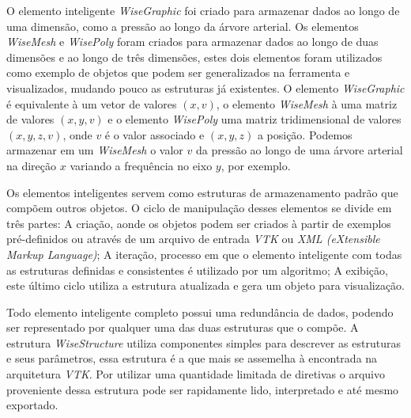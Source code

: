 \documentclass[a4paper,12pt]{monografia}
\theoremstyle{plain}
\theoremstyle{definition}
\theoremstyle{remark}
\begin{document}
O elemento inteligente \textit{WiseGraphic} foi criado para armazenar dados ao longo de uma dimensão, como a pressão ao longo da árvore arterial. Os elementos \textit{WiseMesh} e \textit{WisePoly} foram criados para armazenar dados ao longo de duas dimensões e ao longo de três dimensões, estes dois elementos foram utilizados como exemplo de objetos que podem ser generalizados na ferramenta e visualizados, mudando pouco as estruturas já existentes. O elemento \textit{WiseGraphic} é equivalente à um vetor de valores $(x,v)$, o elemento \textit{WiseMesh} à uma matriz de valores $(x,y,v)$ e o elemento \textit{WisePoly} uma matriz tridimensional de valores $(x,y,z,v)$, onde $v$ é o valor associado e $(x,y,z)$ a posição. Podemos armazenar em um \textit{WiseMesh} o valor $v$ da pressão ao longo de uma árvore arterial na direção $x$ variando a frequência no eixo $y$, por exemplo.

Os elementos inteligentes servem como estruturas de armazenamento padrão que compõem outros objetos. O ciclo de manipulação desses elementos se divide em três partes: A criação, aonde os objetos podem ser criados à partir de exemplos pré-definidos ou através de um arquivo de entrada \textit{VTK} ou \textit{XML (eXtensible Markup Language)}; A iteração, processo em que o elemento inteligente com todas as estruturas definidas e consistentes é utilizado por um algoritmo; A exibição,  este último ciclo utiliza a estrutura atualizada e gera um objeto para visualização.

Todo elemento inteligente completo possui uma redundância de dados, podendo ser representado por qualquer uma das duas estruturas que o compõe. A estrutura \textit{WiseStructure} utiliza componentes simples para descrever as estruturas e seus parâmetros, essa estrutura é a que mais se assemelha à encontrada na arquitetura \textit{VTK}. Por utilizar uma quantidade limitada de diretivas o arquivo proveniente dessa estrutura pode ser rapidamente lido, interpretado e até mesmo exportado.
\end{document}
